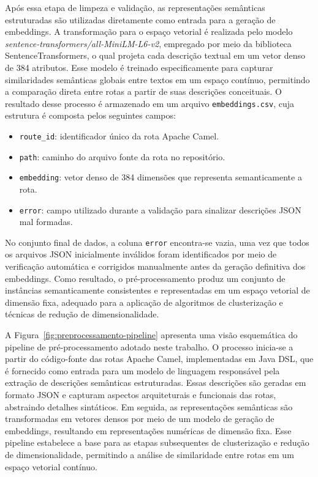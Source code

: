 \documentclass[12pt,a4paper]{article}
\begin{document}
Após essa etapa de limpeza e validação, as representações semânticas estruturadas são utilizadas diretamente como entrada para a geração de embeddings. A transformação para o espaço vetorial é realizada pelo modelo \textit{sentence-transformers/all-MiniLM-L6-v2}, empregado por meio da biblioteca SentenceTransformers, o qual projeta cada descrição textual em um vetor denso de 384 atributos. Esse modelo é treinado especificamente para capturar similaridades semânticas globais entre textos em um espaço contínuo, permitindo a comparação direta entre rotas a partir de suas descrições conceituais. O resultado desse processo é armazenado em um arquivo \texttt{embeddings.csv}, cuja estrutura é composta pelos seguintes campos:

\begin{itemize}
  \item \texttt{route\_id}: identificador único da rota Apache Camel.
  \item \texttt{path}: caminho do arquivo fonte da rota no repositório.
  \item \texttt{embedding}: vetor denso de 384 dimensões que representa semanticamente a rota.
  \item \texttt{error}: campo utilizado durante a validação para sinalizar descrições JSON mal formadas.
\end{itemize}

No conjunto final de dados, a coluna \texttt{error} encontra-se vazia, uma vez que todos os arquivos JSON inicialmente inválidos foram identificados por meio de verificação automática e corrigidos manualmente antes da geração definitiva dos embeddings. Como resultado, o pré-processamento produz um conjunto de instâncias semanticamente consistentes e representadas em um espaço vetorial de dimensão fixa, adequado para a aplicação de algoritmos de clusterização e técnicas de redução de dimensionalidade.

A Figura~\ref{fig:preprocessamento-pipeline} apresenta uma visão esquemática do pipeline de pré-processamento adotado neste trabalho. O processo inicia-se a partir do código-fonte das rotas Apache Camel, implementadas em Java DSL, que é fornecido como entrada para um modelo de linguagem responsável pela extração de descrições semânticas estruturadas. Essas descrições são geradas em formato JSON e capturam aspectos arquiteturais e funcionais das rotas, abstraindo detalhes sintáticos. Em seguida, as representações semânticas são transformadas em vetores densos por meio de um modelo de geração de embeddings, resultando em representações numéricas de dimensão fixa. Esse pipeline estabelece a base para as etapas subsequentes de clusterização e redução de dimensionalidade, permitindo a análise de similaridade entre rotas em um espaço vetorial contínuo.
\end{document}
